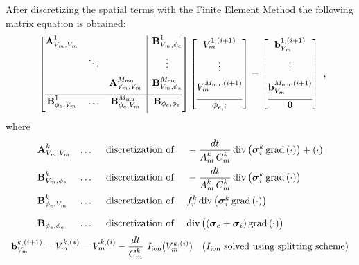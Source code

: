 After discretizing the spatial terms with the Finite Element Method the following matrix equation is obtained:
\begin{equation*}
  \begin{array}{lll}
    \left[\begin{array}{@{}ccc|c@{}}
      \bfA_{V_m,V_m}^1 &  & & \bfB^1_{V_m,\phi_e} \\[2mm]
      & \ddots &   & \vdots \\[2mm]
      &  & \bfA_{V_m,V_m}^{M_\text{mu}} & \bfB^{M_\text{mu}}_{V_m,\phi_e} \\[2mm] \hline
      \bfB_{\phi_e,V_m}^1 & \dots & \bfB_{\phi_e,V_m}^{M_\text{mu}} & \bfB_{\phi_e,\phi_e} \\[2mm]
    \end{array}\right]
    \left[\begin{array}{@{}c@{}}
      V_{m}^{1,(i+1)} \\[2mm] \vdots \\[2mm] V_{m}^{M_\text{mu},(i+1)} \\[2mm]\hline \phi_{e,i} 
    \end{array}\right]
    = 
    \left[\begin{array}{@{}c@{}}
      \bfb_{V_m}^{1,(i+1)} \\[2mm] \vdots \\[2mm] \bfb_{V_m}^{M_\text{mu},(i+1)} \\[2mm]\hline \bfzero
    \end{array}\right]
  \end{array},
\end{equation*}
where
\begin{equation*}
  \begin{array}{lll}
    \textbf{A}^k_{V_m,V_m} &\dots\quad\text{ discretization of }\quad -\displaystyle\frac{\displaystyle{dt}}{\displaystyle{A^k_m\,C_m^k}}\,\hbox{div} \,\big(\boldsymbol{\sigma}_i^k\,\hbox{grad} \,(\cdot)\big) + (\cdot) \\[4mm]
    \textbf{B}^k_{V_m,\phi_e} &\dots\quad\text{ discretization of }\quad -\displaystyle\frac{\displaystyle{dt}}{\displaystyle{A^k_m\,C_m^k}}\,\hbox{div} \,\big(\boldsymbol{\sigma}_i^k\,\hbox{grad} \,(\cdot)\big)\\[4mm]
    \textbf{B}^k_{\phi_e,V_m} &\dots\quad\text{ discretization of }\quad f_r^k\,\hbox{div} \,\big(\boldsymbol{\sigma}_i^k\,\hbox{grad} \,(\cdot)\big)\\[4mm]
    \textbf{B}_{\phi_e,\phi_e} &\dots\quad\text{ discretization of }\quad 
  \hbox{div} \,\big((\boldsymbol{\sigma}_e + \boldsymbol{\sigma}_i)\,\hbox{grad} \,(\cdot)\big)
  \end{array}
\end{equation*}
%
\begin{equation*}
  \begin{array}{lll}
    \textbf{b}_{V_m}^{k,(i+1)} = V_m^{k,(*)} = V_m^{k,(i)} - \displaystyle\frac{\displaystyle{dt}}{\displaystyle{C_m^k}}\,\,I_\text{ion}(V_{m}^{k,(i)}) \quad \text{($I_\text{ion}$ solved using splitting scheme)}
  \end{array}
\end{equation*}
    
